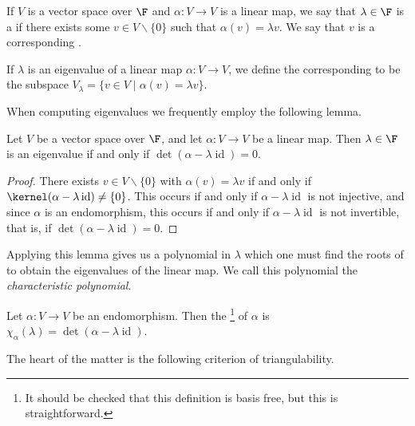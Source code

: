 \documentclass[a4paper]{scrartcl}
\begin{document}
\begin{definition}
    If $V $ is a vector space over $\F$ and $\alpha: V \rightarrow V$ is a linear map, we say that $\lambda \in \F$ is a  if there exists some $v \in V \backslash\{0\}$ such that $\alpha(v) = \lambda v$. We say that $v$ is a corresponding .
\end{definition}

\begin{definition}[Eigenspace]
    If $\lambda$ is an eigenvalue of a linear map $\alpha: V \rightarrow V$, we define the corresponding  to be the subspace $V_\lambda = \{v \in V \mid \alpha(v) = \lambda v\}$.
\end{definition}

When computing eigenvalues we frequently employ the following lemma.

\begin{lemma}
    Let $V$ be a vector space over $\F$, and
    let $\alpha: V \rightarrow V$ be a linear map. Then $\lambda \in \F$ is an eigenvalue if and only if $\det(\alpha - \lambda \operatorname{id}) = 0$.
\end{lemma}
\begin{proof}
    There exists $v \in V \backslash\{0\}$ with $\alpha(v) = \lambda v$ if and only if $\kernel (\alpha - \lambda \operatorname{id}) \neq \{0\}$. This occurs if and only if $\alpha - \lambda \operatorname{id}$ is not injective, and since $\alpha$ is an endomorphism, this occurs if and only if $\alpha - \lambda \operatorname{id}$ is not invertible, that is, if $\det(\alpha - \lambda \operatorname{id}) = 0$.
\end{proof}

Applying this lemma gives us a polynomial in $\lambda$ which one must find the roots of to obtain the eigenvalues of the linear map. We call this polynomial the \emph{characteristic polynomial}.

\begin{definition}
    Let $\alpha: V \rightarrow V$ be an endomorphism. Then the \footnote{It should be checked that this definition is basis free, but this is straightforward.} of $\alpha$ is $\chi_{\alpha}(\lambda) = \det(\alpha - \lambda \operatorname{id})$.
\end{definition}

The heart of the matter is the following criterion of triangulability.
\end{document}
